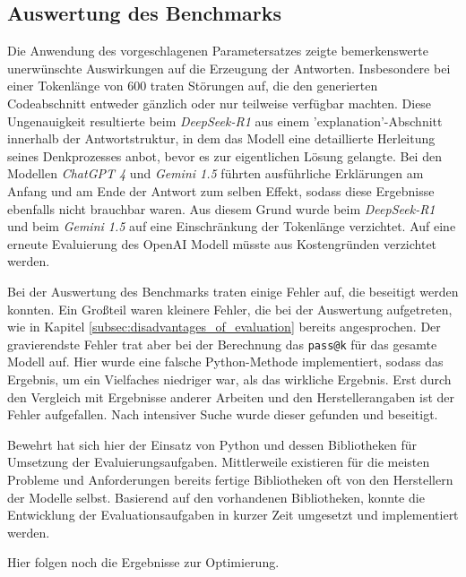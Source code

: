 \subsection{Auswertung des Benchmarks}
Die Anwendung des vorgeschlagenen Parametersatzes zeigte bemerkenswerte unerwünschte Auswirkungen auf die Erzeugung der Antworten. Insbesondere bei einer Tokenlänge von 600 traten Störungen auf, die den generierten Codeabschnitt entweder gänzlich oder nur teilweise verfügbar machten. Diese Ungenauigkeit resultierte beim \textit{DeepSeek-R1} aus einem 'explanation'-Abschnitt innerhalb der Antwortstruktur, in dem das Modell eine detaillierte Herleitung seines Denkprozesses anbot, bevor es zur eigentlichen Lösung gelangte. Bei den Modellen \textit{ChatGPT 4} und \textit{Gemini 1.5} führten ausführliche Erklärungen am Anfang und am Ende der Antwort zum selben Effekt, sodass diese Ergebnisse ebenfalls nicht brauchbar waren. Aus diesem Grund wurde beim \textit{DeepSeek-R1} und beim \textit{Gemini 1.5} auf eine Einschränkung der Tokenlänge verzichtet. Auf eine erneute Evaluierung des OpenAI Modell müsste aus Kostengründen verzichtet werden.\vspace{0.2cm}

Bei der Auswertung des Benchmarks traten einige Fehler auf, die beseitigt werden konnten. Ein Großteil waren kleinere Fehler, die bei der Auswertung aufgetreten, wie in Kapitel \ref{subsec:disadvantages_of_evaluation} bereits angesprochen. Der gravierendste Fehler trat aber bei der Berechnung das \texttt{pass@k} für das gesamte Modell auf. Hier wurde eine falsche Python-Methode implementiert, sodass das Ergebnis, um ein Vielfaches niedriger war, als das wirkliche Ergebnis. Erst durch den Vergleich mit Ergebnisse anderer Arbeiten und den Herstellerangaben ist der Fehler aufgefallen. Nach intensiver Suche wurde dieser gefunden und beseitigt.\vspace{0.2cm}

Bewehrt hat sich hier der Einsatz von Python und dessen Bibliotheken für Umsetzung der Evaluierungsaufgaben. Mittlerweile existieren für die meisten Probleme und Anforderungen bereits fertige Bibliotheken oft von den Herstellern der Modelle selbst. Basierend auf den vorhandenen Bibliotheken, konnte die Entwicklung der Evaluationsaufgaben in kurzer Zeit umgesetzt und implementiert werden.\vspace{0.2cm}


\begin{tcolorbox}[
	enhanced,
	colback=red!5!white,
	colframe=red!75!black!50,
	title= Mein roter Faden
	]
	Hier folgen noch die Ergebnisse zur Optimierung.
\end{tcolorbox}

